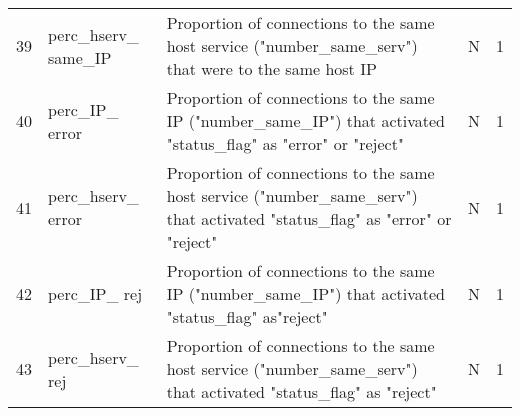 \begin{longtable}{llXll}
39 & perc\_hserv\_ same\_IP & Proportion of connections to the same host service ("number\_same\_serv") that were to the same host IP & N & 1 \\
40 & perc\_IP\_ error & Proportion of connections to the same IP ("number\_same\_IP") that activated "status\_flag" as "error" or "reject" & N & 1 \\
41 & perc\_hserv\_ error & Proportion of connections to the same host service ("number\_same\_serv") that activated "status\_flag" as "error" or "reject" & N & 1 \\
42 & perc\_IP\_ rej & Proportion of connections to the same IP ("number\_same\_IP") that activated "status\_flag" as"reject" & N & 1 \\
43 & perc\_hserv\_ rej & Proportion of connections to the same host service ("number\_same\_serv") that activated "status\_flag" as "reject" & N & 1 \\
    \end{longtable}